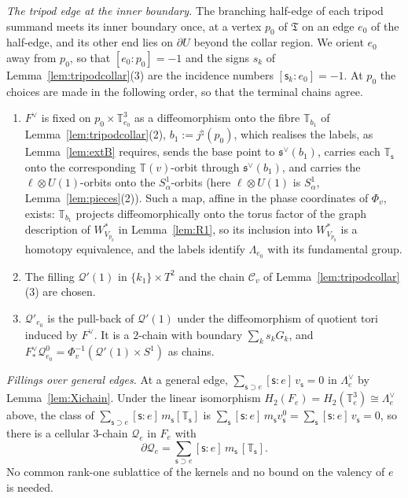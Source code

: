 \emph{The tripod edge at the inner boundary.} The branching half-edge of each tripod summand meets its inner boundary
once, at a vertex $p_0$ of $\mathfrak T$ on an edge $e_0$ of the half-edge, and its other end lies on $\partial U$ beyond the
collar region. We orient $e_0$ away from $p_0$, so that $[e_0:p_0]=-1$ and the signs $s_k$ of
Lemma~\ref{lem:tripodcollar}(3) are the incidence numbers $[\mathsf s_k:e_0]=-1$. At $p_0$ the choices are made in the following order, so that the terminal chains agree.
\begin{enumerate}
\item[(i)] $F^\vee$ is fixed on $p_0\times\mathbb T^3_{e_0}$ as a diffeomorphism onto the fibre $\mathbb T_{b_1}$ of
Lemma~\ref{lem:tripodcollar}(2), $b_1:=j^\natural(p_0)$, which realises the labels, as Lemma~\ref{lem:extB} requires, sends
the base point to $\mathfrak s^\vee(b_1)$, carries each $\mathbb T_{\mathsf s}$ onto the corresponding $\mathbb T(v)$-orbit
through $\mathfrak s^\vee(b_1)$, and carries the $\ell\otimes U(1)$-orbits onto the $S^1_\alpha$-orbits (here $\ell\otimes U(1)$
is $S^1_\alpha$, Lemma~\ref{lem:pieces}(2)). Such a map, affine in the phase coordinates of $\Phi_v$, exists: $\mathbb T_{b_1}$
projects diffeomorphically onto the torus factor of the graph description of $W^*_{V_{p_0}}$ in Lemma~\ref{lem:R1}, so its
inclusion into $W^*_{V_{p_0}}$ is a homotopy equivalence, and the labels identify $\Lambda_{e_0}$ with its fundamental group.
\item[(ii)] The filling $\mathcal Q'(1)$ in $\{k_1\}\times T^2$ and the chain $\mathscr C_v$ of
Lemma~\ref{lem:tripodcollar}(3) are chosen.
\item[(iii)] $\mathcal Q'_{e_0}$ is the pull-back of $\mathcal Q'(1)$ under the diffeomorphism of quotient tori induced by
$F^\vee$. It is a $2$-chain with boundary $\sum_ks_kG_k$, and $F^\vee_*\mathscr Q^0_{e_0}=\Phi_v^{-1}(\mathcal Q'(1)\times
S^1)$ as chains.
\end{enumerate}

\emph{Fillings over general edges.} At a general edge, $\sum_{\mathsf s\supset e}[\mathsf s:e]\,v_{\mathsf s}=0$ in $\Lambda_e^\vee$ by
Lemma~\ref{lem:Xichain}. Under the linear isomorphism $H_2(F_e)=H_2(\mathbb T^3_e)\cong\Lambda^\vee_e$ above, the class of
$\sum_{\mathsf s\supset e}[\mathsf s:e]\,m_{\mathsf s}[\mathbb T_{\mathsf s}]$ is $\sum_{\mathsf s}[\mathsf s:e]\,m_{\mathsf s} v^0_{\mathsf s}=\sum_{\mathsf s}[\mathsf s:e]\,v_{\mathsf s}=0$, so there is a cellular $3$-chain
$\mathscr Q_e$ in $F_e$ with
\[
\partial \mathscr Q_e=\sum_{\mathsf s\supset e}[\mathsf s:e]\,m_{\mathsf s}\,[\mathbb T_{\mathsf s}].
\]
No common rank-one sublattice of the kernels and no bound on the valency of $e$ is needed.

